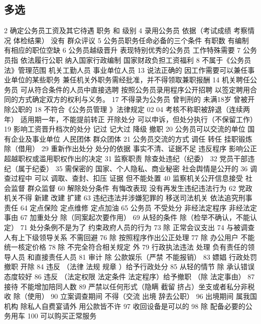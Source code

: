 \documentclass[cyan]{elegantnote}
\begin{document}
\subsection{多选}
\label{sec:orga9bec94}
2 确定公务员工资及其它待遇
职务 和 级别
4 录用公务员 依据（考试成绩 考察情况 体检结果）
没有 群众评议
5 公务员职务任命必备的三个条件
有职数 有编制 有相应的职位空缺
6 公务员越级晋升
表现特别优秀的公务员 工作特殊需要
7 公务员指
依法履行公职
纳入国家行政编制
国家财政负担工资福利
8 不属于《公务员法》管理范围
机关工勤人员
事业单位人员
13 说法正确的
因工作需要可以兼任事业单位的某些职务
兼任机关外职务需经批准，并不得领取兼职报酬
14 机关聘任公务员
可从符合条件的人员中直接选聘
按照公务员录用程序公开招聘
以签定聘用合同的方式确定双方的权利与义务。
17 不得录为公务员
曾判刑的 未满18岁 曾被开除公职的
18 不符合《公务员管理 》法律规定
02 04 考核不称职被辞退（连续两年）
适用期一年，不能提前转正
开除处分 可以申诉，但处分执行（不保留工作）
19 影响工资晋升档次的处分
记过 记大过 降级 撤职
20 公务员可以交流的单位
国有企业及事业单位
人民团体
群众团体
21 公务员交流的方式
调任 转任 挂职锻炼 除（借用）
29 重新作出处分
处分的依据 事实不清、证据不足
违反程序 影响公正
超越职权或滥用职权作出的决定
31 监察职责
除查处违纪（纪委）
32 党员干部违纪（属于纪委）
35 需保密的
国家、个人隐私、商业秘密
社会舆情是公开的
36 调查过程中 可以
调取、查封、扣压 证据
但不能处置
40 监察机关公开信息接受
社会监督 群众监督
60 解除处分条件
有悔改表现
没有再发生违纪违法行为
62 党政机关不得
新建 改建 扩建
63 违纪违法并涉嫌犯罪的
移送司法机关
依法追究刑事责任
64 定点保险 定点维修 定点加油
65 公务员 不受处分
非经法定程序
非经法定事由
67 加重处分
除（同案起次要作用）
69 从轻的条件
除（检举不确认，不能认定）
71 处分条例不是为了
约束政府人员的行为
73 除 正常会议支出
74 与被调查人有上下级领导关系 不需回避
76 除 按照程序作出公正处理
77 除 办公用户
不能统一核定价格
78 除 不完全符合相关规定 外
79 行政执法违法 处理
负有责任的领导人员
和直接责任人员
81 审计
除 公款娱乐（严禁 不能报销）
83 嫖娼 行政处罚
撤职 开除
84 违反 （法律 法规 规章 ）给予行政处分
85 从轻的情节
除 承认错误态度较好
86 违反 （法定权限 法定条件 法定程序）给予撤职
（除 法定事由）
87 接待 不能增加陪同人数
89 严禁以任何形式（隐瞒 截留 挤占）坐支或者私分非税收
除（使用）
90 立案调查期间 不得（交流 出境 辞去公职）
96 出境期间 属我国机构 除私人自费宴请外 用公款皆不许
97 收回设备是可以的
98 除 配备必要的公务用车
100 可以购买正常服务
\end{document}
